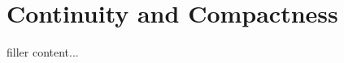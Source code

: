 \documentclass[../../templates/section]{subfiles}
\begin{document}
\section{Continuity and Compactness}\label{sec:continuity-and-compactness}

filler content...
\end{document}
